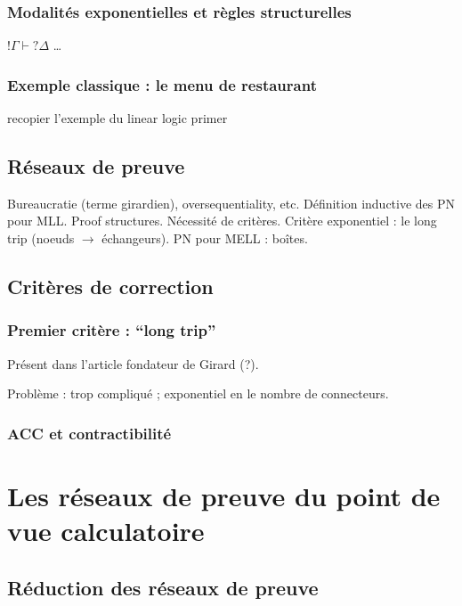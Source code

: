 \documentclass[a4paper, 11pt]{article}
\begin{document}
\subsubsection{Modalités exponentielles et règles structurelles}

$!\Gamma \vdash ?\Delta$ \ldots

\subsubsection{Exemple classique : le menu de restaurant}

recopier l'exemple du linear logic primer

\subsection{Réseaux de preuve}

Bureaucratie (terme girardien), oversequentiality, etc.
Définition inductive des PN pour MLL.
Proof structures.
Nécessité de critères.
Critère exponentiel : le long trip (noeuds $\to$ échangeurs).
PN pour MELL : boîtes.

\subsection{Critères de correction}

\subsubsection{Premier critère : \enquote{long trip}}

Présent dans l'article fondateur de Girard (?).

Problème : trop compliqué ; exponentiel en le nombre de connecteurs.

\subsubsection{ACC et contractibilité}



\section{Les réseaux de preuve du point de vue calculatoire}

\subsection{Réduction des réseaux de preuve}
\end{document}
